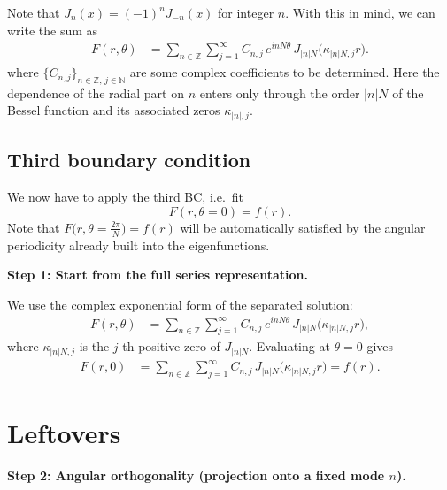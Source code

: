 \documentclass{article}
\begin{document}
Note that $J_n(x) = (-1)^nJ_{-n}(x)$ for integer $n$. With this in mind, we can write the sum as 
\begin{align}
F(r,\theta)
&=
\sum_{n\in\mathbb{Z}}
\sum_{j=1}^{\infty}
C_{n,j}\,
e^{i nN\theta}\,
J_{|n|N}\bigl(\kappa_{|n|N,j} r\bigr). \tag{17)}
\end{align}
where \(\{C_{n,j}\}_{n\in\mathbb{Z},\, j\in\mathbb{N}}\) are some complex coefficients to be determined.  Here the dependence of the radial part on \(n\) enters only through the order \(|n|N\) of the Bessel
function and its associated zeros \(\kappa_{|n|,j}\). 

\subsection*{Third boundary condition}

We now have to apply the third BC, i.e.\ fit
\[
F(r,\theta=0) = f(r).
\]
Note that \(F\bigl(r,\theta = \frac{2\pi}{N}\bigr) = f(r)\) will be automatically
satisfied by the angular periodicity already built into the eigenfunctions.

\medskip

\noindent
\textbf{Step 1: Start from the full series representation.}

We use the complex exponential form of the separated solution:
\begin{align}
F(r,\theta)
&=
\sum_{n\in\mathbb{Z}}
\sum_{j=1}^{\infty}
C_{n,j}\,
e^{i nN\theta}\,
J_{|n|N}\bigl(\kappa_{|n|N,j} r\bigr), \tag{26)}
\end{align}
where \(\kappa_{|n|N,j}\) is the \(j\)-th positive zero of \(J_{|n|N}\).
Evaluating at \(\theta=0\) gives
\begin{align}
F(r,0)
&=
\sum_{n\in\mathbb{Z}}
\sum_{j=1}^{\infty}
C_{n,j}\,
J_{|n|N}\bigl(\kappa_{|n|N,j} r\bigr)
=
f(r). \tag{27)}
\end{align}

\newpage
\section{Leftovers}
\medskip

\noindent
\textbf{Step 2: Angular orthogonality (projection onto a fixed mode \(n\)).}
\end{document}
